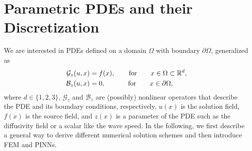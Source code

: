 \documentclass[11pt, fleqn]{article}
\def\cB{{\mathcal B}}
\def\cB{{\mathcal B}}
\def\cG{{\mathcal G}}
\def\bR{{\mathbb R}}
\def\cB{{\mathcal B}}
\begin{document}
\section{Parametric PDEs and their Discretization}\label{sec:technical_background}
%
We are interested in PDEs defined on a domain $\Omega$ with boundary $\partial \Omega$, generalized as
\begin{subequations}
\begin{align}
    \cG_{z}(u, x) &= f(x), \quad \quad \textnormal{for} \quad \quad x \in \Omega \subset \bR^d, \label{eq:generalPDEA} \\
    \cB_{z}(u, x) &= 0, \quad \, \, \quad \quad \textnormal{for} \quad \quad x \in \partial\Omega, \label{eq:generalPDEB}
\end{align} \label{eq:generalPDE}%
\end{subequations}
where $d \in \{1,2,3\}$, $\mathcal{G}_{z}$ and $\cB_{z}$ are (possibly) nonlinear operators that describe the PDE and its boundary conditions, respectively, $u(x)$ is the solution field, $f(x)$ is the source field, and $z(x)$ is a parameter of the PDE such as the diffusivity field or a scalar like the wave speed. 
In the following, we first describe a general way to derive different numerical solution schemes and then introduce \gls*{FEM} and \gls*{PINN}s.

\end{document}
